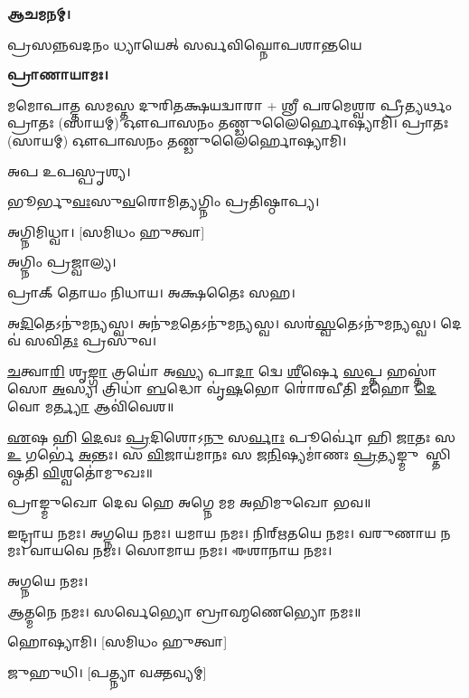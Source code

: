 
\textbf{𑌆𑌚𑌮𑌨𑌮𑍍।}

{𑌪𑍍𑌰𑌸𑌨𑍍𑌨𑌵𑌦𑌨𑌂 𑌧𑍍𑌯𑌾𑌯𑍇𑌤𑍍 𑌸𑌰𑍍𑌵𑌵𑌿𑌘𑍍𑌨𑍋𑌪𑌶𑌾𑌨𑍍𑌤𑌯𑍇}
 
\textbf{𑌪𑍍𑌰𑌾𑌣𑌾𑌯𑌾𑌮𑌃।} 

𑌮𑌮𑍋𑌪𑌾𑌤𑍍𑌤 𑌸𑌮𑌸𑍍𑌤 𑌦𑍁𑌰𑌿𑌤𑌕𑍍𑌷𑌯𑌦𑍍𑌵𑌾𑌰𑌾 + 𑌶𑍍𑌰𑍀 𑌪𑌰𑌮𑍇𑌶𑍍𑌵𑌰 𑌪𑍍𑌰𑍀𑌤𑍍𑌯𑌰𑍍𑌥𑌂 𑌪𑍍𑌰𑌾𑌤𑌃 (𑌸𑌾𑌯𑌮𑍍) 𑌔𑌪𑌾𑌸𑌨𑌂 𑌤𑌣𑍍𑌡𑍁𑌲𑍈𑌰𑍍𑌹𑍋𑌷𑍍𑌯𑌾𑌮𑌿। 𑌪𑍍𑌰𑌾𑌤𑌃 (𑌸𑌾𑌯𑌮𑍍) 𑌔𑌪𑌾𑌸𑌨𑌂 𑌤𑌣𑍍𑌡𑍁𑌲𑍈𑌰𑍍𑌹𑍋𑌷𑍍𑌯𑌾𑌮𑌿।

𑌅𑌪 𑌉𑌪𑌸𑍍𑌪𑍃𑌶𑍍𑌯।


𑌭𑍂𑌰𑍍𑌭𑍁\ul{𑌵𑌃}𑌸𑍁\ul{𑌵}𑌰𑍋𑌮𑌿𑌤𑍍𑌯𑌗𑍍𑌨𑌿𑌂 𑌪𑍍𑌰𑌤𑌿𑌷𑍍𑌠𑌾𑌪𑍍𑌯।

𑌅𑌗𑍍𑌨𑌿𑌮𑌿𑌧𑍍𑌵𑌾। [𑌸𑌮𑌿𑌧𑌂 𑌹𑍁𑌤𑍍𑌵𑌾]

𑌅𑌗𑍍𑌨𑌿𑌂 𑌪𑍍𑌰𑌜𑍍𑌵𑌾𑌲𑍍𑌯।

𑌪𑍍𑌰𑌾𑌕𑍍 𑌤𑍋𑌯𑌂 𑌨𑌿𑌧𑌾𑌯। 𑌅𑌕𑍍𑌷𑌤𑍈𑌃 𑌸𑌹।

𑌅\ul{𑌦𑌿}𑌤𑍇𑌽𑌨𑍁॑𑌮𑌨𑍍𑌯𑌸𑍍𑌵। 𑌅𑌨𑍁॑\ul{𑌮}𑌤𑍇𑌽𑌨𑍁॑𑌮𑌨𑍍𑌯𑌸𑍍𑌵। 𑌸𑌰॑\ul{𑌸𑍍𑌵}𑌤𑍇𑌽𑌨𑍁॑𑌮𑌨𑍍𑌯𑌸𑍍𑌵। 𑌦𑍇𑌵॑ 𑌸𑌵𑌿\ul{𑌤𑌃} 𑌪𑍍𑌰𑌸𑍁॑𑌵।


\ul{𑌚}𑌤𑍍𑌵𑌾\ul{𑌰𑌿} 𑌶𑍃\ul{𑌙𑍍𑌗𑌾} 𑌤𑍍𑌰𑌯𑍋॑ 𑌅\ul{𑌸𑍍𑌯} 𑌪𑌾\ul{𑌦𑌾} 𑌦𑍍𑌵𑍇 \ul{𑌶𑍀}𑌰𑍍\mbox{}𑌷𑍇 \ul{𑌸}𑌪𑍍𑌤 𑌹𑌸𑍍𑌤𑌾॑𑌸𑍋 \ul{𑌅}𑌸𑍍𑌯। 𑌤𑍍𑌰𑌿𑌧𑌾॑ \ul{𑌬}𑌦𑍍𑌧𑍋 𑌵𑍃॑\ul{𑌷}𑌭𑍋 𑌰𑍋॑𑌰𑌵𑍀𑌤𑌿 \ul{𑌮}𑌹𑍋 \ul{𑌦𑍇}𑌵𑍋 𑌮\ul{𑌰𑍍𑌤𑍍𑌯𑌾}\ul{} 𑌆𑌵𑌿॑𑌵𑍇𑌶॥

\ul{𑌏}𑌷 𑌹𑌿 \ul{𑌦𑍇}𑌵𑌃 \ul{𑌪𑍍𑌰}𑌦𑌿𑌶𑍋𑌽\ul{𑌨𑍁} 𑌸\ul{𑌰𑍍𑌵𑌾𑌃} 𑌪𑍂𑌰𑍍𑌵𑍋॑ 𑌹𑌿 \ul{𑌜𑌾}𑌤𑌃 𑌸 \ul{𑌉} 𑌗𑌰𑍍𑌭𑍇॑ \ul{𑌅}𑌨𑍍𑌤𑌃। 𑌸 \ul{𑌵𑌿}𑌜𑌾𑌯॑𑌮𑌾𑌨𑌃 𑌸 𑌜\ul{𑌨𑌿}𑌷𑍍𑌯𑌮𑌾॑𑌣𑌃 \ul{𑌪𑍍𑌰}𑌤𑍍𑌯𑌙𑍍𑌮𑍁𑌖𑌾᳚𑌸𑍍𑌤𑌿𑌷𑍍𑌠𑌤𑌿 \ul{𑌵𑌿}𑌶𑍍𑌵𑌤𑍋॑𑌮𑍁𑌖𑌃॥ 

𑌪𑍍𑌰𑌾𑌙𑍍𑌮𑍁𑌖𑍋 𑌦𑍇𑌵 𑌹𑍇 𑌅𑌗𑍍𑌨𑍇 𑌮𑌮 𑌅𑌭𑌿𑌮𑍁𑌖𑍋 𑌭𑌵॥

𑌇𑌨𑍍𑌦𑍍𑌰𑌾𑌯 𑌨𑌮𑌃। 𑌅𑌗𑍍𑌨𑌯𑍇 𑌨𑌮𑌃। 𑌯𑌮𑌾𑌯 𑌨𑌮𑌃। 𑌨𑌿𑌰𑍍‌𑌋𑌤𑌯𑍇 𑌨𑌮𑌃। 
𑌵𑌰𑍁𑌣𑌾𑌯 𑌨𑌮𑌃। 𑌵𑌾𑌯𑌵𑍇 𑌨𑌮𑌃। 𑌸𑍋𑌮𑌾𑌯 𑌨𑌮𑌃। 𑌈𑌶𑌾𑌨𑌾𑌯 𑌨𑌮𑌃। 

𑌅𑌗𑍍𑌨𑌯𑍇 𑌨𑌮𑌃। 






𑌆𑌤𑍍𑌮𑌨𑍇 𑌨𑌮𑌃। 𑌸𑌰𑍍𑌵𑍇𑌭𑍍𑌯𑍋 𑌬𑍍𑌰𑌾𑌹𑍍𑌮𑌣𑍇𑌭𑍍𑌯𑍋 𑌨𑌮𑌃॥



𑌹𑍋𑌷𑍍𑌯𑌾𑌮𑌿। [𑌸𑌮𑌿𑌧𑌂 𑌹𑍁𑌤𑍍𑌵𑌾]

𑌜𑍁𑌹𑍁𑌧𑌿। [𑌪𑌤𑍍𑌨𑍍𑌯𑌾 𑌵𑌕𑍍𑌤𑌵𑍍𑌯𑌮𑍍]

